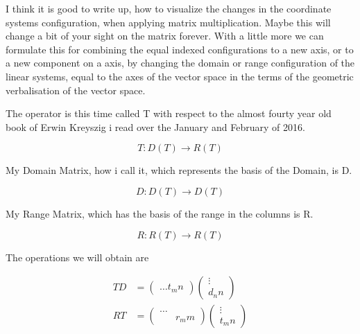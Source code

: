 \documentclass[a4paper]{article}
\begin{document}
I think it is good to write up, how to visualize the changes in the coordinate systems configuration, when applying matrix multiplication. Maybe this will change a bit of your sight on the matrix forever. With a little more we can formulate this for combining the equal indexed configurations to a new axis, or to a new component on a axis, by changing the domain or range configuration of the linear systems, equal to the axes of the vector space in the terms of the geometric verbalisation of the vector space.


The operator is this time called T with respect to the almost fourty year old book of Erwin Kreyszig \cite{Kreyszig} i read over the January and February of 2016.

\begin{displaymath}
	T : D(T) \rightarrow R(T)
\end{displaymath}

My Domain Matrix, how i call it, which represents the basis of the Domain, is D.

\begin{displaymath}

	D : D(T) \rightarrow D(T)
\end{displaymath}

My Range Matrix, which has the basis of the range in the columns is R.

\begin{displaymath}

	R : R(T) \rightarrow R(T)
\end{displaymath}

The operations we will obtain are

\begin{displaymath}
\begin{align}
	TD &= \begin{pmatrix}\hdots t_mn\end{pmatrix}\begin{pmatrix}\vdots\\d_nn\end{pmatrix}\\
	RT &= \begin{pmatrix}\hdots\\&r_mm\end{pmatrix}\begin{pmatrix}\vdots\\t_mn\end{pmatrix}
	\end{align}
\end{displaymath}
\end{document}
